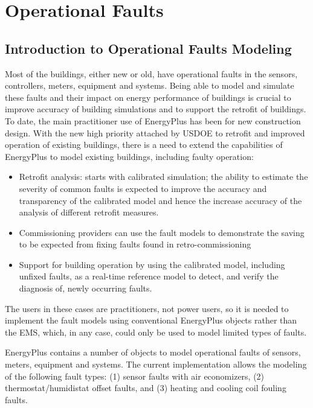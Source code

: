\chapter{Operational Faults}\label{operational-faults}

\section{Introduction to Operational Faults Modeling}\label{introduction-to-operational-faults-modeling}

Most of the buildings, either new or old, have operational faults in the sensors, controllers, meters, equipment and systems. Being able to model and simulate these faults and their impact on energy performance of buildings is crucial to improve accuracy of building simulations and to support the retrofit of buildings. To date, the main practitioner use of EnergyPlus has been for new construction design. With the new high priority attached by USDOE to retrofit and improved operation of existing buildings, there is a need to extend the capabilities of EnergyPlus to model existing buildings, including faulty operation:

\begin{itemize}
\tightlist
\item
  Retrofit analysis: starts with calibrated simulation; the ability to estimate the severity of common faults is expected to improve the accuracy and transparency of the calibrated model and hence the increase accuracy of the analysis of different retrofit measures.\\
\item
  Commissioning providers can use the fault models to demonstrate the saving to be expected from fixing faults found in retro-commissioning
\item
  Support for building operation by using the calibrated model, including unfixed faults, as a real-time reference model to detect, and verify the diagnosis of, newly occurring faults.
\end{itemize}

The users in these cases are practitioners, not power users, so it is needed to implement the fault models using conventional EnergyPlus objects rather than the EMS, which, in any case, could only be used to model limited types of faults.

EnergyPlus contains a number of objects to model operational faults of sensors, meters, equipment and systems. The current implementation allows the modeling of the following fault types: (1) sensor faults with air economizers, (2) thermostat/humidistat offset faults, and (3) heating and cooling coil fouling faults.

